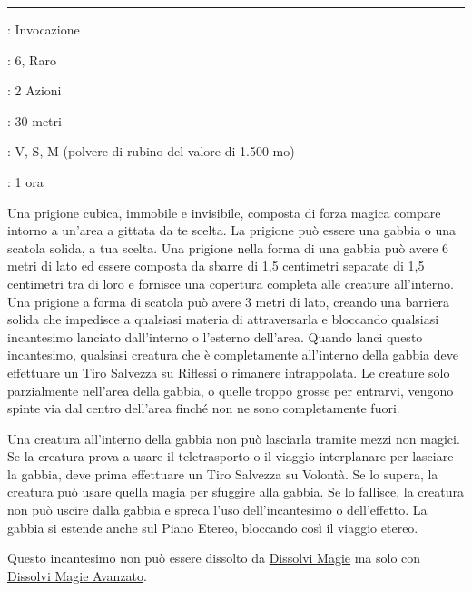 \begin{multicols}{2}
\smallskip\noindent\rule{\linewidth}{2pt} \hypertarget{Gabbia di Forza}{}\smallskip{}
\noindent
\begin{description}[noitemsep, topsep=0pt, parsep=0pt, partopsep=0pt, leftmargin=0cm, labelwidth=2.8cm]
	\item[\textbf{Lista di Magia}]: Invocazione
	\item[\textbf{Livello}]: 6, Raro
	\item[\textbf{T. di Lancio}]: 2 Azioni
	\item[\textbf{Gittata}]: 30 metri
	\item[\textbf{Componenti}]: V, S, M (polvere di rubino del valore di 1.500 mo)
	\item[\textbf{Durata}]: 1 ora
\end{description}

Una prigione cubica, immobile e invisibile, composta di forza magica compare intorno a un'area a gittata da te scelta. La prigione può essere una gabbia o una scatola solida, a tua scelta. Una prigione nella forma di una gabbia può avere 6 metri di lato ed essere composta da sbarre di 1,5 centimetri separate di 1,5 centimetri tra di loro e fornisce una copertura completa alle creature all'interno. Una prigione a forma di scatola può avere 3 metri di lato, creando una barriera solida che impedisce a qualsiasi materia di attraversarla e bloccando qualsiasi incantesimo lanciato dall'interno o l'esterno dell'area. Quando lanci questo incantesimo, qualsiasi creatura che è completamente all'interno della gabbia deve effettuare un Tiro Salvezza su Riflessi o rimanere intrappolata. Le creature solo parzialmente nell'area della gabbia, o quelle troppo grosse per entrarvi, vengono spinte via dal centro dell'area finché non ne sono completamente fuori.

Una creatura all'interno della gabbia non può lasciarla tramite mezzi non magici. Se la creatura prova a usare il teletrasporto o il viaggio interplanare per lasciare la gabbia, deve prima effettuare un Tiro Salvezza su Volontà. Se lo supera, la creatura può usare quella magia per sfuggire alla gabbia. Se lo fallisce, la creatura non può uscire dalla gabbia e spreca l'uso dell'incantesimo o dell'effetto. La gabbia si estende anche sul Piano Etereo, bloccando così il viaggio etereo.

Questo incantesimo non può essere dissolto da \hyperlink{dissolvimagie}{Dissolvi Magie} ma solo con \hyperlink{dissolvimagieavanzato}{Dissolvi Magie Avanzato}.


\end{multicols}

